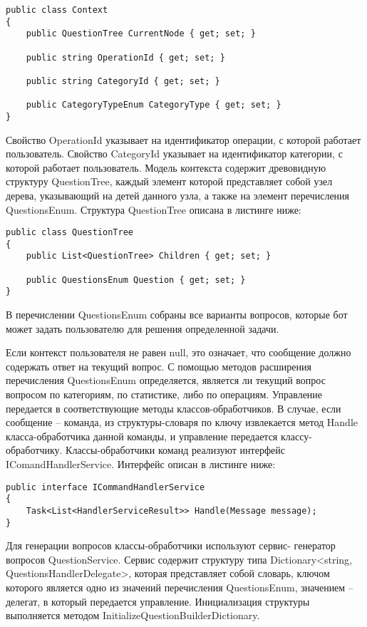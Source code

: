 \lstset{style=sharpc}
\begin{lstlisting}
public class Context
{
	public QuestionTree CurrentNode { get; set; }

	public string OperationId { get; set; }

	public string CategoryId { get; set; }

	public CategoryTypeEnum CategoryType { get; set; }
}
\end{lstlisting}

Свойство OperationId указывает на идентификатор операции, с которой работает пользователь.
Свойство CategoryId указывает на идентификатор категории, с которой работает пользователь.
Модель контекста содержит древовидную \cite{trees_algorithm} структуру QuestionTree, каждый элемент которой представляет собой узел дерева, указывающий на детей данного узла, а также на элемент перечисления QuestionsEnum. Структура QuestionTree описана в листинге ниже:

\lstset{style=sharpc}
\begin{lstlisting}
public class QuestionTree
{
	public List<QuestionTree> Children { get; set; }

	public QuestionsEnum Question { get; set; }
}
\end{lstlisting}

В перечислении QuestionsEnum собраны все варианты вопросов, которые бот может задать пользователю для решения определенной задачи.

Если контекст пользователя не равен null, это означает, что сообщение должно содержать ответ на текущий вопрос. С помощью методов расширения перечисления QuestionsEnum определяется, является ли текущий вопрос вопросом по категориям, по статистике, либо по операциям. Управление передается в соответствующие методы классов-обработчиков.
В случае, если сообщение – команда, из структуры-словаря по ключу извлекается метод Handle класса-обработчика данной команды, и управление передается классу-обработчику.
Классы-обработчики команд реализуют интерфейс IComandHandlerService. Интерфейс описан в листинге ниже:

\lstset{style=sharpc}
\begin{lstlisting}
public interface ICommandHandlerService
{
	Task<List<HandlerServiceResult>> Handle(Message message);
}
\end{lstlisting}

Для генерации вопросов классы-обработчики используют сервис- \linebreak генератор вопросов QuestionService. Сервис содержит структуру типа \linebreak Dictionary<string, QuestionsHandlerDelegate>, которая представляет собой
словарь, ключом которого является одно из значений перечисления \linebreak QuestionsEnum, значением – делегат, в который передается управление.
Инициализация структуры выполняется методом \linebreak InitializeQuestionBuilderDictionary.

